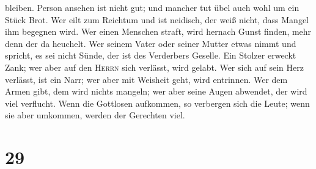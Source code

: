 bleiben.  Person ansehen ist nicht gut; und mancher tut
übel auch wohl um ein Stück Brot.  Wer eilt zum Reichtum
und ist neidisch, der weiß nicht, dass Mangel ihm begegnen wird.
 Wer einen Menschen straft, wird hernach Gunst finden,
mehr denn der da heuchelt.  Wer seinem Vater oder seiner
Mutter etwas nimmt und spricht, es sei nicht Sünde, der ist des
Verderbers Geselle.  Ein Stolzer erweckt Zank; wer aber
auf den \textsc{Herrn} sich verlässt, wird gelabt.  Wer
sich auf sein Herz verlässt, ist ein Narr; wer aber mit Weisheit geht,
wird entrinnen.  Wer dem Armen gibt, dem wird nichts
mangeln; wer aber seine Augen abwendet, der wird viel verflucht.
 Wenn die Gottlosen aufkommen, so verbergen sich die
Leute; wenn sie aber umkommen, werden der Gerechten viel.

\hypertarget{section-28}{%
\section{29}\label{section-28}}

